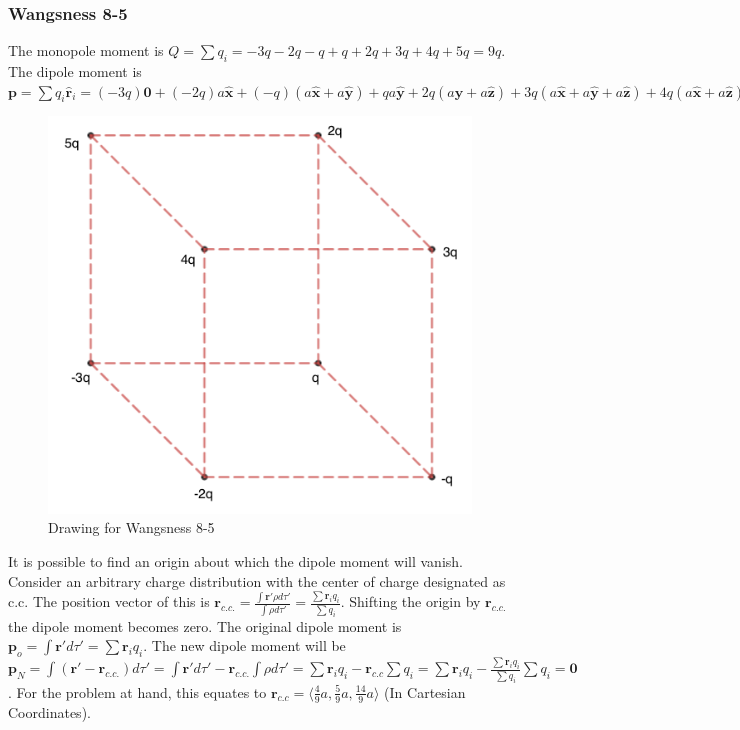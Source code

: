\documentclass[crop=false,class=article,oneside]{standalone}
\begin{document}
        \subsubsection{Wangsness 8-5}
        The monopole moment is $Q = \sum q_i = -3q-2q-q+q+2q+3q+4q+5q=9q$.
        The dipole moment is $\mathbf{p} = \sum q_i \hat{\mathbf{r}}_i = (-3q)\mathbf{0} + (-2q)a\hat{\mathbf{x}} + (-q)(a\hat{\mathbf{x}}+a\hat{\mathbf{y}})+qa\hat{\mathbf{y}} + 2q(a\hat{\mathbf{y}}+a\hat{\mathbf{z}})+3q(a\hat{\mathbf{x}}+a\hat{\mathbf{y}}+a\hat{\mathbf{z}})+4q(a\hat{\mathbf{x}}+a\hat{\mathbf{z}})+5qa\hat{\mathbf{z}}=4qa\hat{\mathbf{x}}+5qa\hat{\mathbf{y}}+14aq\hat{\mathbf{z}}$
        \begin{figure}[htbp]
            \centering
            \captionsetup{type=figure}
            \includegraphics[scale=0.4]{8-5.png}
            \caption{Drawing for Wangsness 8-5}
        \end{figure}
        It is possible to find an origin about which the dipole moment will vanish. Consider an arbitrary charge distribution with the center of charge designated as c.c. The position vector of this is $\mathbf{r}_{c.c.} = \frac{\int \mathbf{r}' \rho d\tau '}{\int \rho d\tau '} = \frac{\sum \mathbf{r}_i q_i}{\sum q_i}$. Shifting the origin by $\mathbf{r}_{c.c.}$ the dipole moment becomes zero. The original dipole moment is $\mathbf{p}_{o} = \int \mathbf{r}' d\tau ' = \sum \mathbf{r}_i q_i$. The new dipole moment will be $\mathbf{p}_N = \int (\mathbf{r}' - \mathbf{r}_{c.c.})d\tau' = \int \mathbf{r}' d\tau' - \mathbf{r}_{c.c.} \int \rho d\tau' = \sum \mathbf{r}_i q_i - \mathbf{r}_{c.c} \sum q_i = \sum \mathbf{r}_i q_i - \frac{\sum \mathbf{r}_i q_i }{\sum q_i}\sum q_i = \mathbf{0}$. For the problem at hand, this equates to $\mathbf{r}_{c.c} = \langle \frac{4}{9}a, \frac{5}{9}a, \frac{14}{9}a\rangle$ (In Cartesian Coordinates).
\end{document}
